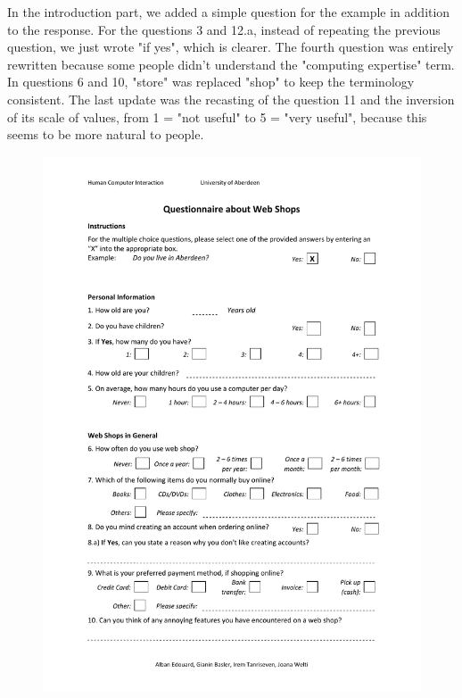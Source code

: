 \label{sec:improvements}
 In the introduction part, we added a simple question for the example in addition to the response. For the questions 3 and 12.a, instead of repeating the previous question, we just wrote "if yes", which is clearer. The fourth question was entirely rewritten because some people didn't understand the "computing expertise" term. In questions 6 and 10, "store" was replaced "shop" to keep the terminology consistent. The last update was the recasting of the question 11 and the inversion of its scale of values, from 1 = "not useful" to 5 = "very useful", because this seems to be more natural to people. 

\begin{figure}[H]
\begin{center}
\includegraphics[scale=0.75]{User_Involvement_Methods/Questionnaires/Questionnaire_Web_Shops_v3.pdf}
\end{center}
\end{figure}
